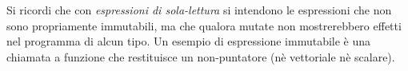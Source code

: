 Si ricordi che con \textit{espressioni di sola-lettura} si intendono le espressioni che non sono propriamente 
immutabili, ma che qualora mutate non mostrerebbero effetti nel programma di alcun tipo. Un esempio di espressione 
immutabile è una chiamata a funzione che restituisce un non-puntatore (nè vettoriale nè scalare). \\
